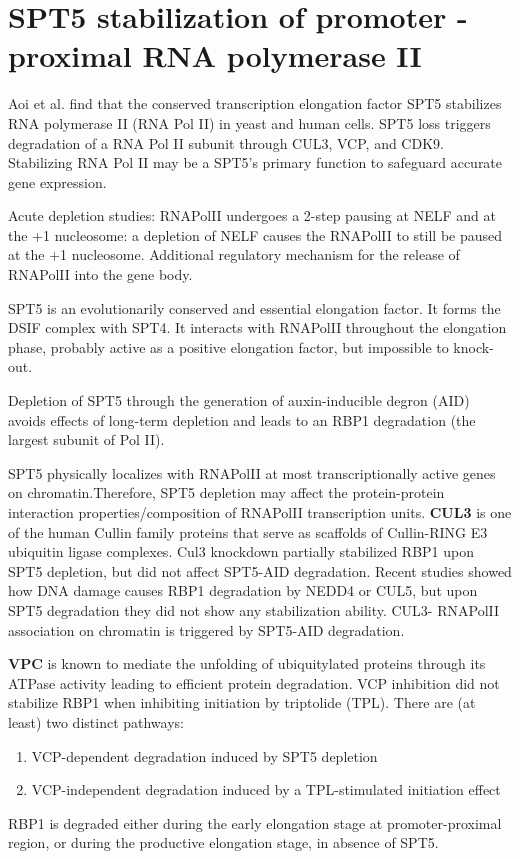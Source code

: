\section{SPT5 stabilization of promoter - proximal RNA polymerase II}
Aoi et al. find that the conserved transcription elongation factor SPT5 stabilizes RNA polymerase II (RNA Pol II) in yeast and human
cells. SPT5 loss triggers degradation of a RNA Pol II subunit through CUL3, VCP, and CDK9. Stabilizing RNA Pol II may be a SPT5’s primary function to safeguard accurate gene expression.

Acute depletion studies: RNAPolII undergoes a 2-step pausing at NELF and at the +1 nucleosome: a depletion of NELF causes the RNAPolII to still be paused at the +1 nucleosome. Additional regulatory mechanism for the release of RNAPolII into the gene body.

SPT5 is an evolutionarily conserved and essential elongation factor. It forms the DSIF complex with SPT4. It interacts with RNAPolII throughout the elongation phase, probably active as a positive elongation factor, but impossible to knock-out.

Depletion of SPT5 through the generation of auxin-inducible degron (AID) avoids effects of long-term depletion and leads to an RBP1 degradation (the largest subunit of Pol II). 

SPT5 physically localizes with RNAPolII at most transcriptionally active genes on chromatin.Therefore, SPT5 depletion may affect the protein-protein interaction properties/composition of RNAPolII transcription units. \textbf{CUL3} is one of the human Cullin family proteins that serve as scaffolds of Cullin-RING E3 ubiquitin ligase complexes. Cul3 knockdown partially stabilized RBP1 upon SPT5 depletion, but did not affect SPT5-AID degradation. Recent studies showed how DNA damage causes RBP1 degradation by NEDD4 or CUL5, but upon SPT5 degradation they did not show any stabilization ability. CUL3- RNAPolII association on chromatin is triggered by SPT5-AID degradation.

\textbf{VPC} is known to mediate the unfolding of ubiquitylated proteins through its ATPase activity leading to efficient protein degradation.
VCP inhibition did not stabilize RBP1 when inhibiting initiation by triptolide (TPL).
There are (at least) two distinct pathways:
\begin{enumerate}
\item VCP-dependent degradation induced by SPT5 depletion
\item VCP-independent degradation induced by a TPL-stimulated initiation effect
\end{enumerate}
RBP1 is degraded either during the early elongation stage at promoter-proximal region, or during the productive elongation stage, in absence of SPT5.


